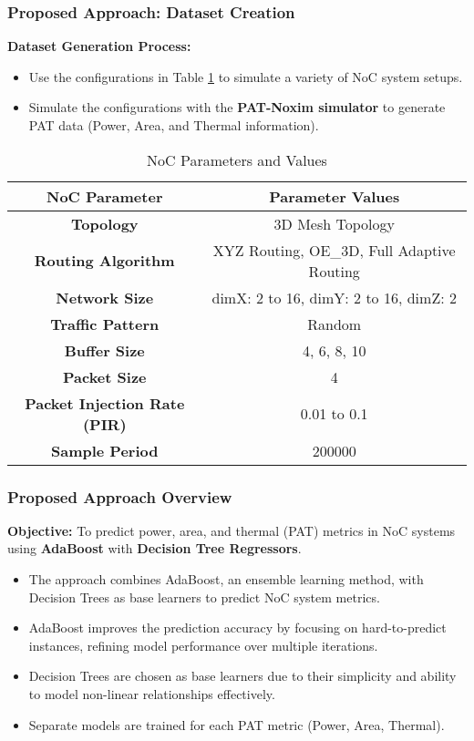 \documentclass{beamer}
\begin{document}
\begin{frame}
\frametitle{Proposed Approach: Dataset Creation}

\textbf{Dataset Generation Process:}

\begin{itemize}
  \item Use the configurations in Table \ref{tab:noc_params} to simulate a variety of NoC system setups.
    \item Simulate the configurations with the \textbf{PAT-Noxim simulator} to generate PAT data (Power, Area, and Thermal information).
\end{itemize}
\begin{table}[h!]
\centering
\begin{adjustbox}{max width=\textwidth}
\begin{tabular}{|c|c|}
\hline
\textbf{NoC Parameter} & \textbf{Parameter Values} \\
\hline
\textbf{Topology} & 3D Mesh Topology \\
\hline
\textbf{Routing Algorithm} & XYZ Routing, OE\_3D, Full Adaptive Routing \\
\hline
\textbf{Network Size} & dimX: 2 to 16, dimY: 2 to 16, dimZ: 2 \\
\hline
\textbf{Traffic Pattern} & Random \\
\hline
\textbf{Buffer Size} & 4, 6, 8, 10 \\
\hline
\textbf{Packet Size} & 4 \\
\hline
\textbf{Packet Injection Rate (PIR)} & 0.01 to 0.1 \\
\hline
\textbf{Sample Period} & 200000 \\
\hline
\end{tabular}
\end{adjustbox}
\caption{NoC Parameters and Values}
\label{tab:noc_params}
\end{table}

\end{frame}

\begin{frame}
\frametitle{Proposed Approach Overview}

\textbf{Objective:}
To predict power, area, and thermal (PAT) metrics in NoC systems using \textbf{AdaBoost} with \textbf{Decision Tree Regressors}.

\begin{itemize}
    \item The approach combines AdaBoost, an ensemble learning method, with Decision Trees as base learners to predict NoC system metrics.
    \item AdaBoost improves the prediction accuracy by focusing on hard-to-predict instances, refining model performance over multiple iterations.
    \item Decision Trees are chosen as base learners due to their simplicity and ability to model non-linear relationships effectively.
    \item Separate models are trained for each PAT metric (Power, Area, Thermal).
\end{itemize}
\end{frame}
\end{document}

